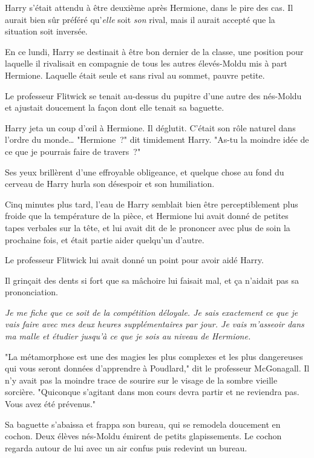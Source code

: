 Harry s'était attendu à être deuxième après Hermione, dans le pire des cas. Il aurait bien sûr préféré qu'\emph{elle} soit \emph{son} rival, mais il aurait accepté que la situation soit inversée.

En ce lundi, Harry se destinait à être bon dernier de la classe, une position pour laquelle il rivalisait en compagnie de tous les autres élevés-Moldu mis à part Hermione. Laquelle était seule et sans rival au sommet, pauvre petite.

Le professeur Flitwick se tenait au-dessus du pupitre d'une autre des nés-Moldu et ajustait doucement la façon dont elle tenait sa baguette.

Harry jeta un coup d'œil à Hermione. Il déglutit. C'était son rôle naturel dans l'ordre du monde… "Hermione~?" dit timidement Harry. "As-tu la moindre idée de ce que je pourrais faire de travers~?"

Ses yeux brillèrent d'une effroyable obligeance, et quelque chose au fond du cerveau de Harry hurla son désespoir et son humiliation.

Cinq minutes plus tard, l'eau de Harry semblait bien être perceptiblement plus froide que la température de la pièce, et Hermione lui avait donné de petites tapes verbales sur la tête, et lui avait dit de le prononcer avec plus de soin la prochaine fois, et était partie aider quelqu'un d'autre.

Le professeur Flitwick lui avait donné un point pour avoir aidé Harry.

Il grinçait des dents si fort que sa mâchoire lui faisait mal, et ça n'aidait pas sa prononciation.

\emph{Je me fiche que ce soit de la compétition déloyale. Je sais exactement ce que je vais faire avec mes deux heures supplémentaires par jour. Je vais m'asseoir dans ma malle et étudier jusqu'à ce que je sois au niveau de Hermione.}

\later

"La métamorphose est une des magies les plus complexes et les plus dangereuses qui vous seront données d'apprendre à Poudlard," dit le professeur McGonagall. Il n'y avait pas la moindre trace de sourire sur le visage de la sombre vieille sorcière. "Quiconque s'agitant dans mon cours devra partir et ne reviendra pas. Vous avez été prévenus."

Sa baguette s'abaissa et frappa son bureau, qui se remodela doucement en cochon. Deux élèves nés-Moldu émirent de petits glapissements. Le cochon regarda autour de lui avec un air confus puis redevint un bureau.

